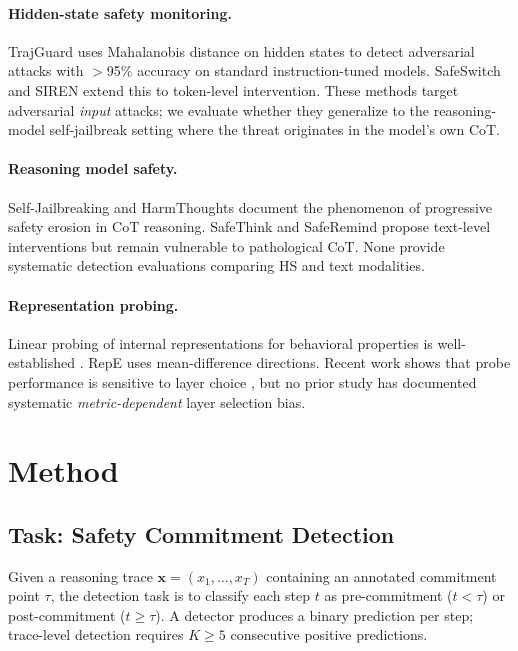 \documentclass[11pt]{article}
\begin{document}
\paragraph{Hidden-state safety monitoring.}
TrajGuard \cite{wang2024mitigating} uses Mahalanobis distance on hidden states to detect adversarial attacks with $>$95\% accuracy on standard instruction-tuned models. SafeSwitch and SIREN \cite{ji2024llmguard} extend this to token-level intervention. These methods target adversarial \emph{input} attacks; we evaluate whether they generalize to the reasoning-model self-jailbreak setting where the threat originates in the model's own CoT.

\paragraph{Reasoning model safety.}
Self-Jailbreaking \cite{wen2025thinkingmakesllmssusceptible} and HarmThoughts \cite{zhou2025hiddenriskslargereasoning} document the phenomenon of progressive safety erosion in CoT reasoning. SafeThink and SafeRemind \cite{zheng2025safethink} propose text-level interventions but remain vulnerable to pathological CoT. None provide systematic detection evaluations comparing HS and text modalities.

\paragraph{Representation probing.}
Linear probing of internal representations for behavioral properties is well-established \cite{li2024inferencetime,burns2023discovering}. RepE \cite{zou2023representation} uses mean-difference directions. Recent work shows that probe performance is sensitive to layer choice \cite{belrose2023eliciting}, but no prior study has documented systematic \emph{metric-dependent} layer selection bias.


\section{Method}

\subsection{Task: Safety Commitment Detection}

Given a reasoning trace $\mathbf{x} = (x_1, \ldots, x_T)$ containing an annotated commitment point $\tau$, the detection task is to classify each step $t$ as pre-commitment ($t < \tau$) or post-commitment ($t \geq \tau$). A detector produces a binary prediction per step; trace-level detection requires $K \geq 5$ consecutive positive predictions.
\end{document}
